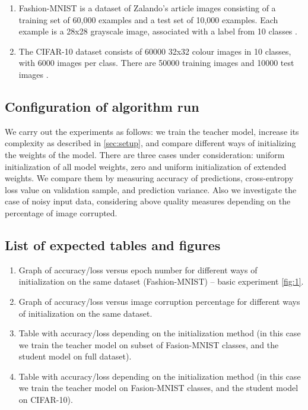 \documentclass[80pt]{article}
\begin{document}
\begin{enumerate}
    \item Fashion-MNIST is a dataset of Zalando's article images consisting of a training set of 60,000 examples and a test set of 10,000 examples. Each example is a 28x28 grayscale image, associated with a label from 10 classes  \citep{fashionmnist}.
    
    \item The CIFAR-10 dataset consists of 60000 32x32 colour images in 10 classes, with 6000 images per class. There are 50000 training images and 10000 test images \citep{cifar10}.
\end{enumerate}

\subsection{Configuration of algorithm run}

We carry out the experiments as follows: we train the teacher model, increase its complexity as described in \autoref{sec:setup}, and compare different ways of initializing the weights of the model. There are three cases under consideration: uniform initialization of all model weights, zero and uniform initialization of extended weights. We compare them by measuring accuracy of predictions, cross-entropy loss value on validation sample, and prediction variance. Also we investigate the case of noisy input data, considering above quality measures depending on the percentage of image corrupted.

\subsection{List of expected tables and figures}

\begin{enumerate}
    \item Graph of accuracy/loss versus epoch number for different ways of initialization on the same dataset (Fashion-MNIST) -- basic experiment \ref{fig:1}.
    \item Graph of accuracy/loss versus image corruption percentage for different ways of initialization on the same dataset.
    \item Table with accuracy/loss depending on the initialization method (in this case we train the teacher model on subset of Fasion-MNIST classes, and the student model on full dataset).
    \item Table with accuracy/loss depending on the initialization method (in this case we train the teacher model on Fasion-MNIST classes, and the student model on CIFAR-10).
\end{enumerate}
\end{document}
